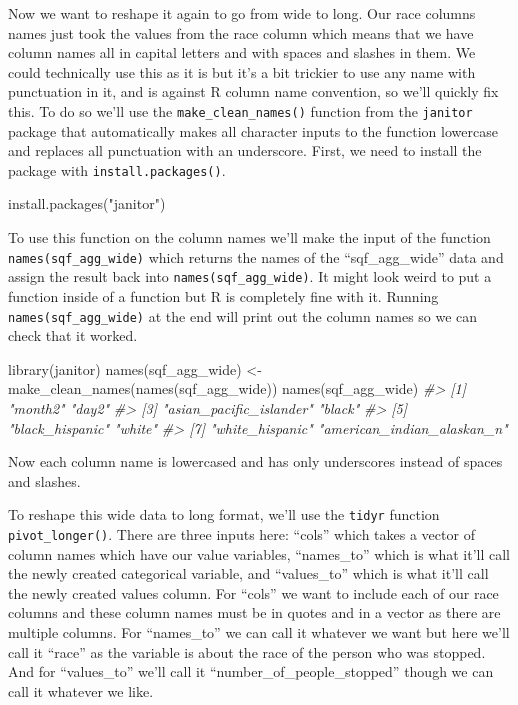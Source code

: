 \documentclass[
]{krantz}
\makeatletter
\newenvironment{Shaded}{\begin{snugshade}}{\end{snugshade}}
\newcommand{\CommentTok}[1]{\textcolor[rgb]{0.37,0.37,0.37}{\textit{#1}}}
\newcommand{\FunctionTok}[1]{\textcolor[rgb]{0,0,0}{#1}}
\newcommand{\NormalTok}[1]{#1}
\newcommand{\OtherTok}[1]{\textcolor[rgb]{0.37,0.37,0.37}{#1}}
\newcommand{\StringTok}[1]{\textcolor[rgb]{0.5,0.5,0.5}{#1}}
\newenvironment{kframe}{%
\medskip{}
\setlength{\fboxsep}{.8em}
 \def\at@end@of@kframe{}%
 \ifinner\ifhmode%
  \def\at@end@of@kframe{\end{minipage}}%
  \begin{minipage}{\columnwidth}%
 \fi\fi%
 \def\FrameCommand##1{\hskip\@totalleftmargin \hskip-\fboxsep
 \colorbox{shadecolor}{##1}\hskip-\fboxsep
     \hskip-\linewidth \hskip-\@totalleftmargin \hskip\columnwidth}%
 \MakeFramed {\advance\hsize-\width
   \@totalleftmargin\z@ \linewidth\hsize
   \@setminipage}}%
 {\par\unskip\endMakeFramed%
 \at@end@of@kframe}
\renewenvironment{Shaded}{\begin{kframe}}{\end{kframe}}
\makeatother
\begin{document}
Now we want to reshape it again to go from wide to long. Our
race columns names just took the values from the race column
which means that we have column names all in capital letters
and with spaces and slashes in them. We could technically
use this as it is but it's a bit trickier to use any name
with punctuation in it, and is against R column name
convention, so we'll quickly fix this. To do so we'll use
the \texttt{make\_clean\_names()} function from the
\texttt{janitor} package that automatically makes all
character inputs to the function lowercase and replaces all
punctuation with an underscore. First, we need to install
the package with \texttt{install.packages()}.

\begin{Shaded}
\begin{Highlighting}[]
\FunctionTok{install.packages}\NormalTok{(}\StringTok{"janitor"}\NormalTok{)}
\end{Highlighting}
\end{Shaded}

To use this function on the column names we'll make the
input of the function \texttt{names(sqf\_agg\_wide)} which
returns the names of the ``sqf\_agg\_wide'' data and assign
the result back into \texttt{names(sqf\_agg\_wide)}. It
might look weird to put a function inside of a function but
R is completely fine with it. Running
\texttt{names(sqf\_agg\_wide)} at the end will print out the
column names so we can check that it worked.

\begin{Shaded}
\begin{Highlighting}[]
\FunctionTok{library}\NormalTok{(janitor)}
\FunctionTok{names}\NormalTok{(sqf\_agg\_wide) }\OtherTok{\textless{}{-}} \FunctionTok{make\_clean\_names}\NormalTok{(}\FunctionTok{names}\NormalTok{(sqf\_agg\_wide))}
\FunctionTok{names}\NormalTok{(sqf\_agg\_wide)}
\CommentTok{\#\textgreater{} [1] "month2"                    "day2"                     }
\CommentTok{\#\textgreater{} [3] "asian\_pacific\_islander"    "black"                    }
\CommentTok{\#\textgreater{} [5] "black\_hispanic"            "white"                    }
\CommentTok{\#\textgreater{} [7] "white\_hispanic"            "american\_indian\_alaskan\_n"}
\end{Highlighting}
\end{Shaded}

Now each column name is lowercased and has only underscores
instead of spaces and slashes.

To reshape this wide data to long format, we'll use the
\texttt{tidyr} function \texttt{pivot\_longer()}. There are
three inputs here: ``cols'' which takes a vector of column
names which have our value variables, ``names\_to'' which is
what it'll call the newly created categorical variable, and
``values\_to'' which is what it'll call the newly created
values column. For ``cols'' we want to include each of our
race columns and these column names must be in quotes and in
a vector as there are multiple columns. For ``names\_to'' we
can call it whatever we want but here we'll call it ``race''
as the variable is about the race of the person who was
stopped. And for ``values\_to'' we'll call it
``number\_of\_people\_stopped'' though we can call it
whatever we like.
\end{document}
